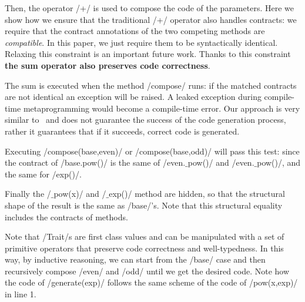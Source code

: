 


Then, the operator /+/ is used to compose the code of the parameters.
Here we show how we ensure that the traditional /+/ operator also handles contracts: we require that the contract annotations of the two competing methods are \emph{compatible}.
In this paper, we just require them to be syntactically identical. Relaxing this constraint is an important future work.
Thanks to this constraint \textbf{the sum operator also preserves code correctness}. %

The sum is executed when the method /compose/
runs: if the matched contracts are not identical an exception will be raised. A leaked exception during compile-time metaprogramming would become a compile-time error. 
Our approach is very similar to~\cite{servetto2014meta} and does not guarantee the success of the code generation process, rather it guarantees that if it succeeds, correct code is generated.

Executing /compose(base,even)/ or /compose(base,odd)/ will pass this test: since the contract of /base.pow()/
is the same of /even.$\_$pow()/ and /even.$\_$pow()/, and the same for /exp()/.

Finally the /$\_$pow(x)/ and /$\_$exp()/ method are hidden, so that the structural shape of the result is
the same as /base/'s.
Note that this structural equality includes the contracts of methods.

Note that /Trait/s are first class values and can be manipulated with a set of primitive operators that preserve code correctness and well-typedness.
In this way, by inductive reasoning, we can start from the /base/ case and then recursively compose /even/ and /odd/ until we get the desired code.
Note how the code of /generate(exp)/ follows the same scheme of the code of /pow(x,exp)/ in line 1.

